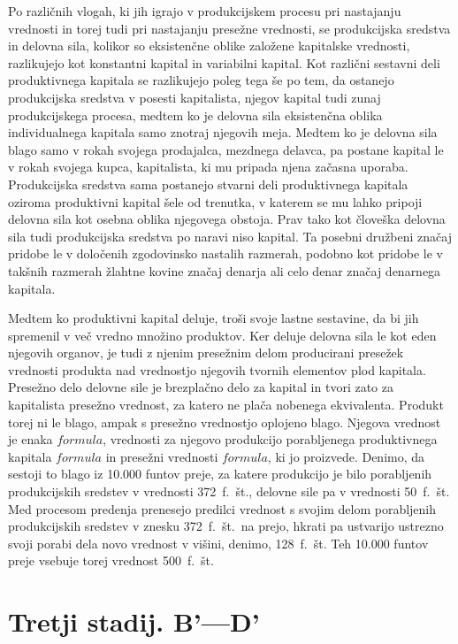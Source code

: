 \documentclass[kapital_02.tex]{subfiles}
\begin{document}
Po različnih vlogah, ki jih igrajo v produkcijskem procesu pri nastajanju vrednosti in torej tudi pri nastajanju presežne vrednosti, se produkcijska sredstva in delovna sila, kolikor so eksistenčne oblike založene kapitalske vrednosti, razlikujejo kot konstantni kapital in variabilni kapital. Kot različni sestavni deli produktivnega kapitala se razlikujejo poleg tega še po tem, da ostanejo produkcijska sredstva v posesti kapitalista, njegov kapital tudi zunaj produkcijskega procesa, medtem ko je delovna sila eksistenčna oblika individualnega kapitala samo znotraj njegovih meja. Medtem ko je delovna sila blago samo v rokah svojega prodajalca, mezdnega delavca, pa postane kapital le v rokah svojega kupca, kapitalista, ki mu pripada njena začasna uporaba. Produkcijska sredstva sama postanejo stvarni deli produktivnega kapitala oziroma produktivni kapital šele od trenutka, v katerem se mu lahko pripoji delovna sila kot osebna oblika njegovega obstoja. Prav tako kot človeška delovna sila tudi produkcijska sredstva po naravi niso kapital. Ta posebni družbeni značaj pridobe le v določenih zgodovinsko nastalih razmerah, podobno kot pridobe le v takšnih razmerah žlahtne kovine značaj denarja ali celo denar značaj denarnega kapitala.

Medtem ko produktivni kapital deluje, troši svoje lastne sestavine, da bi jih spremenil v več vredno množino produktov. Ker deluje delovna sila le kot eden njegovih organov, je tudi z njenim presežnim delom producirani presežek vrednosti produkta nad vrednostjo njegovih tvornih elementov plod kapitala. Presežno delo delovne sile je brezplačno delo za kapital in tvori zato za kapitalista presežno vrednost, za katero ne plača nobenega ekvivalenta. Produkt torej ni le blago, ampak s presežno vrednostjo oplojeno blago. Njegova vrednost je enaka \( formula \), vrednosti za njegovo produkcijo porabljenega produktivnega kapitala \( formula \) in presežni vrednosti \( formula \), ki jo proizvede. Denimo, da sestoji to blago iz 10.000 funtov preje, za katere produkcijo je bilo porabljenih produkcijskih sredstev v vrednosti 372~f.~št., delovne sile pa v vrednosti 50~f.~št. Med procesom predenja prenesejo predilci vrednost s svojim delom porabljenih produkcijskih sredstev v znesku 372~f.~št.\ na prejo, hkrati pa ustvarijo ustrezno svoji porabi dela novo vrednost v višini, denimo, 128~f.~št. Teh 10.000 funtov preje vsebuje torej vrednost 500~f.~št.

\section{Tretji stadij. B'---D'}
\end{document}
